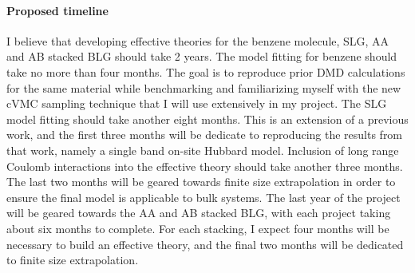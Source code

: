 \documentclass[12pt]{article}
\begin{document}
\paragraph{Proposed timeline} I believe that developing effective theories for the benzene molecule, SLG, AA and AB stacked BLG should take 2 years. 
The model fitting for benzene should take no more than four months.
The goal is to reproduce prior DMD calculations for the same material while benchmarking and familiarizing myself with the new cVMC sampling technique that I will use extensively in my project.
The SLG model fitting should take another eight months.
This is an extension of a previous work, and the first three months will be dedicate to reproducing the results from that work, namely a single band on-site Hubbard model.
Inclusion of long range Coulomb interactions into the effective theory should take another three months.
The last two months will be geared towards finite size extrapolation in order to ensure the final model is applicable to bulk systems.
The last year of the project will be geared towards the AA and AB stacked BLG, with each project taking about six months to complete.
For each stacking, I expect four months will be necessary to build an effective theory, and the final two months will be dedicated to finite size extrapolation.

\begin{multicols}{2}
\begin{spacing}{0.5}
{\fontsize{10}{5}\selectfont


}
\end{spacing}
\end{multicols}
\end{document}
